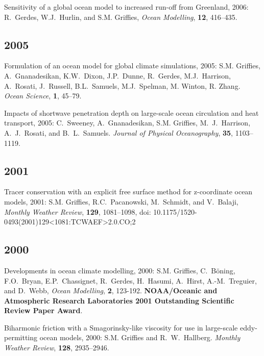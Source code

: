 \begin{etaremune}
\item Sensitivity of a global ocean model to increased run-off from Greenland, 2006: R.\ Gerdes, W.J.\ Hurlin, and S.M. Grif\/f\/ies, {\em Ocean Modelling}, {\bf 12}, 416--435.
  
\subsection*{\sc \color{Maroon} 2005}
  
\item Formulation of an ocean model for global climate simulations, 2005: S.M. Grif\/f\/ies, A.\ Gnanadesikan, K.W.\ Dixon, J.P.\ Dunne, R.\ Gerdes, M.J.\ Harrison, A.\ Rosati, J.\ Russell, B.L.\ Samuels, M.J.\ Spelman, M. Winton, R. Zhang. {\em Ocean Science}, {\bf
1}, 45--79.

\item Impacts of shortwave penetration depth on large-scale ocean circulation and heat transport, 2005: C.\ Sweeney, A.\ Gnanadesikan, S.M. Grif\/f\/ies, M.\ J.\ Harrison, A.\ J.\ Rosati, and B.\ L.\ Samuels.  {\em Journal of Physical Oceanography}, {\bf 35},
1103--1119.

\subsection*{\sc \color{Maroon} 2001}

\item Tracer conservation with an explicit free surface method for z-coordinate ocean models, 2001: 
  S.M. Grif\/f\/ies, R.C.\  Pacanowski, M.\ Schmidt, and V.\ Balaji, {\em Monthly Weather  Review}, {\bf 129}, 1081--1098, doi: 10.1175/1520-0493(2001)129<1081:TCWAEF>2.0.CO;2

\subsection*{\sc \color{Maroon} 2000}

\item Developments in ocean climate modelling, 2000:  S.M. Grif\/f\/ies, C.\ B\"oning, F.O.\ Bryan, E.P.\ Chassignet, R.\  Gerdes, H.\ Hasumi, A.\ Hirst, A.-M.\ Treguier, and D.\ Webb, {\em Ocean Modelling}, {\bf 2}, 123-192.  {\bf NOAA/Oceanic and Atmospheric Research Laboratories 2001 Outstanding Scientific Review Paper Award}.

\item Biharmonic friction with a  Smagorinsky-like viscosity for use in large-scale eddy-permitting ocean models, 2000: S.M. Grif\/f\/ies and R.\ W.\ Hallberg.  {\em Monthly Weather Review}, {\bf 128}, 2935--2946.


\end{etaremune}
